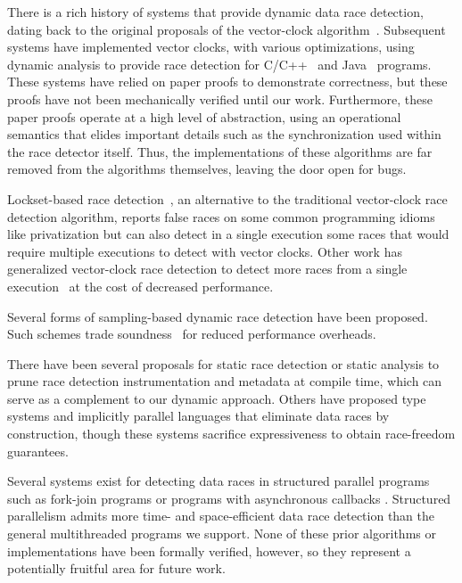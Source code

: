 \documentclass[preprint, 10pt]{sigplanconf}
\begin{document}
There is a rich history of systems that provide dynamic data race detection, dating back to the original proposals of the vector-clock algorithm~\cite{vcfidge,vcmattern,lamporthb}. Subsequent systems have implemented vector clocks, with various optimizations, using dynamic analysis to provide race detection for C/C++~\cite{pozniansky_efficient_2003,serebryany_threadsanitizer:_2009} and Java~\cite{christiaens_trade:_2001,elmas_goldilocks:_2007,fasttrack,fasttrack,slimstate} programs. These systems have relied on paper proofs to demonstrate correctness, but these proofs have not been mechanically verified until our work. Furthermore, these paper proofs operate at a high level of abstraction, using an operational semantics that elides important details such as the synchronization used within the race detector itself. Thus, the implementations of these algorithms are far removed from the algorithms themselves, leaving the door open for bugs.

Lockset-based race detection~\cite{dinning_detecting_1991,savage_eraser:_1997}, an alternative to the traditional vector-clock race detection algorithm, reports false races on some common programming idioms like privatization but can also detect in a single execution some races that would require multiple executions to detect with vector clocks. Other work has generalized vector-clock race detection to detect more races from a single execution~\cite{smaragdakis_sound_2012,sen_detecting_2005,chen_parametric_2007} at the cost of decreased performance.

Several forms of sampling-based dynamic race detection have been proposed. Such schemes trade soundness~\cite{greathouse_demand-driven_2011,bond_pacer:_2010,marino_literace:_2009,erickson_effective_2010,effinger-dean_ifrit:_2012} for reduced performance overheads.

There have been several proposals for static race detection \cite{engler_racerx:_2003,naik_effective_2006} or static analysis \cite{flanagan_redcard:_2013,Das:2015:SPA:2775085.2766451} to prune race detection instrumentation and metadata at compile time, which can serve as a complement to our dynamic approach. Others have proposed type systems \cite{abadi_types_2006,bocchino_type_2009} and implicitly parallel languages \cite{rinard_design_1998,guy_blelloch_nesl:_1992} that eliminate data races by construction, though these systems sacrifice expressiveness to obtain race-freedom guarantees.

Several systems exist for detecting data races in structured parallel programs
such as fork-join programs
\cite{john_mellor-crummey_--fly_1991,Bender:2004:sporder:1007912.1007933,mai_zheng_grace:_2011,boyer2008automated,raman:spd3} or programs with asynchronous callbacks \cite{petrov_race_2012,raychev_effective_2013,hsiao_race_2014,Bielik:2015:SRD:2814270.2814303}. Structured parallelism admits more time- and space-efficient data race detection than the general multithreaded programs we support. None of these prior algorithms or implementations have been formally verified, however, so they represent a potentially fruitful area for future work.
\end{document}
